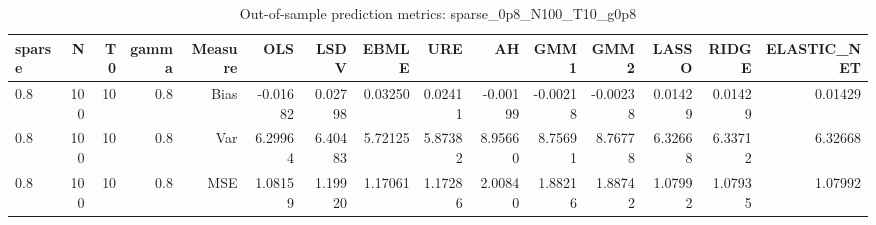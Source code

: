 \begin{table}[!htbp]\centering
\caption{Out-of-sample prediction metrics: sparse_0p8_N100_T10_g0p8}
\label{tab:table3_sparse_0p8_N100_T10_g0p8}
\begin{tabular}{lrrrrrrrrrrrrrr}
\hline
sparse & N & T0 & gamma & Measure & OLS & LSDV & EBMLE & URE & AH & GMM1 & GMM2 & LASSO & RIDGE & ELASTIC_NET \\
\hline
0.8 & 100 & 10 & 0.8 & Bias & -0.01682 & 0.02798 & 0.03250 & 0.02411 & -0.00199 & -0.00218 & -0.00238 & 0.01429 & 0.01429 & 0.01429 \\
0.8 & 100 & 10 & 0.8 & Var & 6.29964 & 6.40483 & 5.72125 & 5.87382 & 8.95660 & 8.75691 & 8.76778 & 6.32668 & 6.33712 & 6.32668 \\
0.8 & 100 & 10 & 0.8 & MSE & 1.08159 & 1.19920 & 1.17061 & 1.17286 & 2.00840 & 1.88216 & 1.88742 & 1.07992 & 1.07935 & 1.07992 \\
\hline
\end{tabular}
\end{table}

